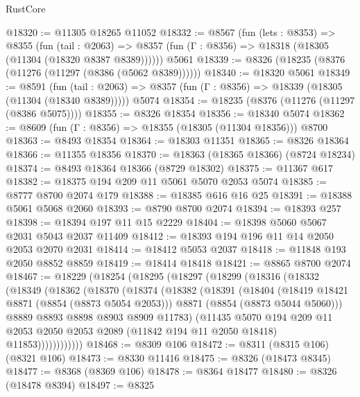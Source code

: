 \begin{lexlean}{RustCore}
\begin{coremodule}
@18320 := @11305 @18265 @11052
@18332 := @8567
    (fun (lets : @8353) =>
    @8355
      (fun (tail : @2063) =>
      @8357 (fun (Γ : @8356) => @18318 (@18305 (@11304 (@18320 @8387 @8389))))))
    @5061
@18339 := @8326 (@18235 (@8376 (@11276 (@11297 (@8386 (@5062 @8389))))))
@18340 := @18320 @5061
@18349 := @8591
    (fun (tail : @2063) => @8357 (fun (Γ : @8356) => @18339 (@18305 (@11304 (@18340 @8389)))))
    @5074
@18354 := @18235 (@8376 (@11276 (@11297 (@8386 @5075))))
@18355 := @8326 @18354
@18356 := @18340 @5074
@18362 := @8609 (fun (Γ : @8356) => @18355 (@18305 (@11304 @18356))) @8700
@18363 := @8493 @18354
@18364 := @18303 @11351
@18365 := @8326 @18364
@18366 := @11355 @18356
@18370 := @18363 (@18365 @18366) (@8724 @18234)
@18374 := @8493 @18364 @18366 (@8729 @18302)
@18375 := @11367 @617
@18382 := @18375 @194 @209 @11 @5061 @5070 @2053 @5074
@18385 := @8777 @8700 @2074 @179
@18388 := @18385 @616 @16 @25
@18391 := @18388 @5061 @5068 @2060
@18393 := @8790 @8700 @2074
@18394 := @18393 @257
@18398 := @18394 @197 @11 @15 @2229
@18404 := @18398 @5060 @5067 @2031 @5043 @2037 @11409
@18412 := @18393 @194 @196 @11 @14 @2050 @2053 @2070 @2031
@18414 := @18412 @5053 @2037
@18418 := @11848 @193 @2050 @8852 @8859
@18419 := @18414 @18418
@18421 := @8865 @8700 @2074
@18467 := @18229
    (@18254
      (@18295
        (@18297
          (@18299
            (@18316
              (@18332
                (@18349
                  (@18362
                    (@18370
                      (@18374
                        (@18382
                          (@18391
                            (@18404
                              (@18419 @18421 @8871 (@8854 (@8873 @5054 @2053)))
                              @8871
                              (@8854 (@8873 @5044 @5060)))
                            @8889
                            @8893
                            @8898
                            @8903
                            @8909
                            @11783)
                          (@11435
                            @5070
                            @194
                            @209
                            @11
                            @2053
                            @2050
                            @2053
                            @2089
                            (@11842 @194 @11 @2050 @18418)
                            @11853))))))))))))
@18468 := @8309 @106
@18472 := @8311 (@8315 @106) (@8321 @106)
@18473 := @8330 @11416
@18475 := @8326 (@18473 @8345)
@18477 := @8368 (@8369 @106)
@18478 := @8364 @18477
@18480 := @8326 (@18478 @8394)
@18497 := @8325

\end{coremodule}
\end{lexlean}
